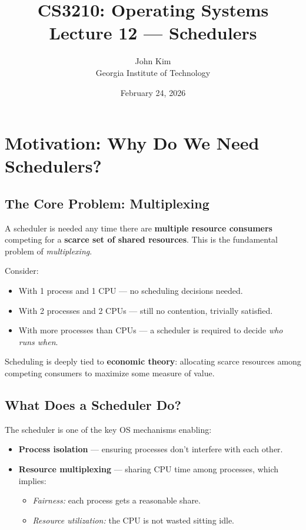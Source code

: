 \documentclass[11pt]{article}
\title{\textbf{CS3210: Operating Systems} \\ Lecture 12 --- Schedulers}
\author{John Kim \\ Georgia Institute of Technology}
\date{February 24, 2026}
\begin{document}
\maketitle
\tableofcontents
\newpage

\section{Motivation: Why Do We Need Schedulers?}

\subsection{The Core Problem: Multiplexing}

A scheduler is needed any time there are \textbf{multiple resource consumers} competing for a \textbf{scarce set of shared resources}. This is the fundamental problem of \emph{multiplexing}.

Consider:
\begin{itemize}
    \item With 1 process and 1 CPU --- no scheduling decisions needed.
    \item With 2 processes and 2 CPUs --- still no contention, trivially satisfied.
    \item With more processes than CPUs --- a scheduler is required to decide \emph{who runs when}.
\end{itemize}

Scheduling is deeply tied to \textbf{economic theory}: allocating scarce resources among competing consumers to maximize some measure of value.

\subsection{What Does a Scheduler Do?}

The scheduler is one of the key OS mechanisms enabling:
\begin{itemize}
    \item \textbf{Process isolation} --- ensuring processes don't interfere with each other.
    \item \textbf{Resource multiplexing} --- sharing CPU time among processes, which implies:
    \begin{itemize}
        \item \emph{Fairness:} each process gets a reasonable share.
        \item \emph{Resource utilization:} the CPU is not wasted sitting idle.
    \end{itemize}
\end{itemize}
\end{document}
